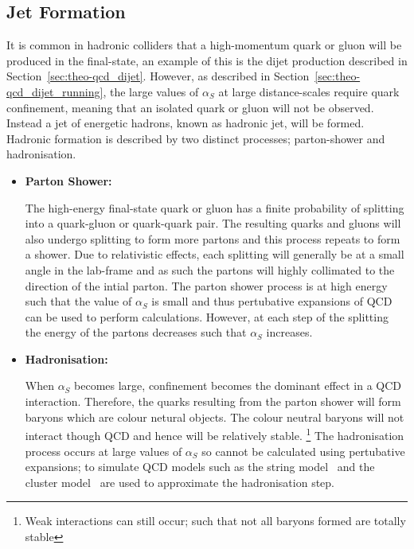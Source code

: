 \subsection{Jet Formation}
\label{sec:theo-qcd_jets}

It is common in hadronic colliders that a high-momentum quark or gluon will be produced in the final-state,
an example of this is the dijet production described in Section~\ref{sec:theo-qcd_dijet}.
However, as described in Section~\ref{sec:theo-qcd_dijet_running},
the large values of $\alpha_S$ at large distance-scales require quark confinement, meaning that an isolated quark or gluon will not be observed.
Instead a jet of energetic hadrons, known as hadronic jet, will be formed.
Hadronic formation is described by two distinct processes; parton-shower and hadronisation.

\begin{itemize}[leftmargin=*]
\item\textbf{Parton Shower:}

  The high-energy final-state quark or gluon has a finite probability of splitting into a quark-gluon or quark-quark pair.
  The resulting quarks and gluons will also undergo splitting to form more partons and this process repeats to form a shower.
  Due to relativistic effects, each splitting will generally be at a small angle in the lab-frame
  and as such the partons will highly collimated to the direction of the intial parton.
  The parton shower process is at high energy such that the value of $\alpha_S$ is small
  and thus pertubative expansions of QCD can be used to perform calculations.
  However, at each step of the splitting the energy of the partons decreases such that $\alpha_S$ increases.
  
\item\textbf{Hadronisation:}
  
  When $\alpha_S$ becomes large, confinement becomes the dominant effect in a QCD interaction.
  Therefore, the quarks resulting from the parton shower will form baryons which are colour netural objects.
  The colour neutral baryons will not interact though QCD and hence will be relatively stable.
  \footnote{Weak interactions can still occur; such that not all baryons formed are totally stable}
  The hadronisation process occurs at large values of $\alpha_S$ so cannot be calculated using pertubative expansions;
  to simulate QCD models such as the string model~\cite{theo-qcd_jet_string} and the
  cluster model~\cite{theo-qcd_jet_cluster} are used to approximate the hadronisation step.

\end{itemize}
  
